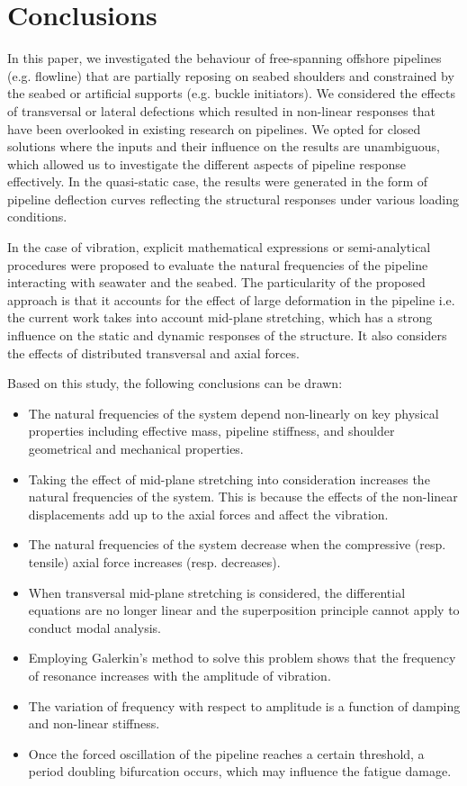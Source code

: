 \documentclass[3p,doublespacing,authoryear,11pt]{elsarticle} %
\begin{document}
\section{Conclusions}
In this paper, we investigated the behaviour of free-spanning offshore pipelines (e.g. flowline) that are partially reposing on seabed shoulders and constrained by the seabed or artificial supports (e.g. buckle initiators). We considered the effects of transversal or lateral defections which resulted in non-linear responses that have been overlooked in existing research on pipelines. We opted for closed solutions where the inputs and their influence on the results are unambiguous, which allowed us to investigate the different aspects of pipeline response effectively. In the quasi-static case, the results were generated in the form of pipeline deflection curves reflecting the structural responses under various loading conditions. %

In the case of vibration, explicit mathematical expressions or semi-analytical procedures were proposed to evaluate the natural frequencies of the pipeline interacting with seawater and the seabed. The particularity of the proposed approach is that it accounts for the effect of large deformation in the pipeline i.e. the current work takes into account mid-plane stretching, which has a strong influence on the static and dynamic responses of the structure. It also considers the effects of distributed transversal and axial forces. 

Based on this study, the following conclusions can be drawn: 
\begin{itemize}
  \item The natural frequencies of the system depend non-linearly on key physical properties including effective mass, pipeline stiffness, and shoulder geometrical and mechanical properties.
  \item Taking the effect of mid-plane stretching into consideration increases the natural frequencies of the system. This is because the effects of the non-linear displacements add up to the axial forces and affect the vibration.  
  \item The natural frequencies of the system decrease when the compressive (resp. tensile) axial force increases (resp. decreases).   
  \item When transversal mid-plane stretching is considered, the differential equations are no longer linear and the superposition principle cannot apply to conduct modal analysis. 
  \item Employing Galerkin's method to solve this problem shows that the frequency of resonance increases with the amplitude of vibration. 
   \item The variation of frequency with respect to amplitude is a function of damping and non-linear stiffness. 
  \item Once the forced oscillation of the pipeline reaches a certain threshold, a period doubling bifurcation occurs, which may influence the fatigue damage.
\end{itemize}
\end{document}
